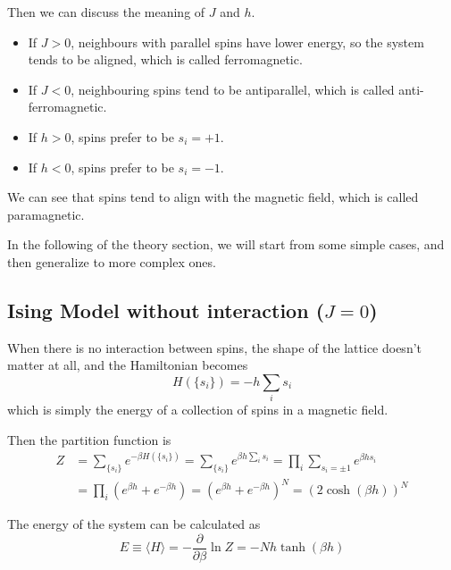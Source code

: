 \documentclass[11pt]{article}
\begin{document}
	Then we can discuss the meaning of $J$ and $h$.
	\begin{itemize}
		\item If $J > 0$, neighbours with parallel spins have lower energy, so the system tends to be aligned, which is called ferromagnetic.
		\item If $J < 0$, neighbouring spins tend to be antiparallel, which is called anti-ferromagnetic.
	\end{itemize}
	\begin{itemize}
		\item If $h > 0$, spins prefer to be $s_i = +1$.
		\item If $h < 0$, spins prefer to be $s_i = -1$.
	\end{itemize}
	We can see that spins tend to align with the magnetic field, which is called paramagnetic.


	In the following of the theory section, we will start from some simple cases, and then generalize to more complex ones.

	\subsection{Ising Model without interaction ($J=0$)}

	When there is no interaction between spins, the shape of the lattice doesn't matter at all, and the Hamiltonian becomes
	\begin{equation} \label{eq:HamiltonianNoInteraction}
		H(\{s_i\}) = -h \sum_i s_i
	\end{equation}
	which is simply the energy of a collection of spins in a magnetic field.

	Then the partition function is
	\begin{equation} \label{eq:PartitionFunctionNoInteraction}
		\begin{aligned}
			Z &= \sum_{\{s_i\}} e^{-\beta H(\{s_i\})} = \sum_{\{s_i\}} e^{\beta h \sum_i s_i} = \prod_i \sum_{s_i=\pm1} e^{\beta h s_i} \\
			&= \prod_i (e^{\beta h} + e^{-\beta h}) = (e^{\beta h} + e^{-\beta h})^N = (2\cosh(\beta h))^N
		\end{aligned}
	\end{equation}

	The energy of the system can be calculated as
	\begin{equation} \label{eq:EnergyNoInteraction}
		E \equiv \langle H \rangle = -\frac{\partial}{\partial \beta} \ln Z = - N h \tanh(\beta h)
	\end{equation}
\end{document}
